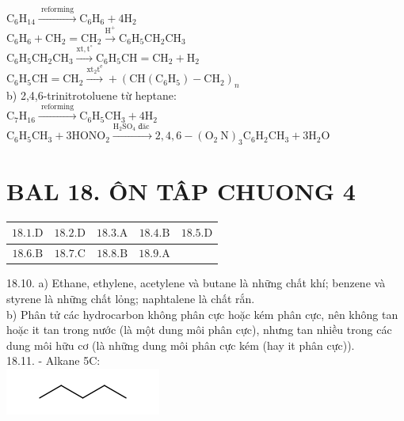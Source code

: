\documentclass[10pt]{article}
\begin{document}
$\mathrm{C}_{6} \mathrm{H}_{14} \xrightarrow{\text { reforming }} \mathrm{C}_{6} \mathrm{H}_{6}+4 \mathrm{H}_{2}$\\
$\mathrm{C}_{6} \mathrm{H}_{6}+\mathrm{CH}_{2}=\mathrm{CH}_{2} \xrightarrow{\mathrm{H}^{+}} \mathrm{C}_{6} \mathrm{H}_{5} \mathrm{CH}_{2} \mathrm{CH}_{3}$\\
$\mathrm{C}_{6} \mathrm{H}_{5} \mathrm{CH}_{2} \mathrm{CH}_{3} \xrightarrow{\mathrm{xt}, \mathrm{t}^{\circ}} \mathrm{C}_{6} \mathrm{H}_{5} \mathrm{CH}=\mathrm{CH}_{2}+\mathrm{H}_{2}$\\
$\mathrm{C}_{6} \mathrm{H}_{5} \mathrm{CH}=\mathrm{CH}_{2} \xrightarrow{\mathrm{xt}_{2} \mathrm{t}^{\mathrm{e}}}+\left(\mathrm{CH}\left(\mathrm{C}_{6} \mathrm{H}_{5}\right)-\mathrm{CH}_{2}\right)_{n}$\\
b) 2,4,6-trinitrotoluene từ heptane:\\
$\mathrm{C}_{7} \mathrm{H}_{16} \xrightarrow{\text { reforming }} \mathrm{C}_{6} \mathrm{H}_{5} \mathrm{CH}_{3}+4 \mathrm{H}_{2}$\\
$\mathrm{C}_{6} \mathrm{H}_{5} \mathrm{CH}_{3}+3 \mathrm{HONO}_{2} \xrightarrow{\mathrm{H}_{2} \mathrm{SO}_{4} \text { đăc }} 2,4,6-\left(\mathrm{O}_{2} \mathrm{~N}\right)_{3} \mathrm{C}_{6} \mathrm{H}_{2} \mathrm{CH}_{3}+3 \mathrm{H}_{2} \mathrm{O}$

\section*{BAL 18. ÔN TÂP CHUONG 4}
\begin{center}
\begin{tabular}{|c|c|c|c|c|}
\hline
$18.1 . \mathrm{D}$ & $18.2 . \mathrm{D}$ & $18.3 . \mathrm{A}$ & $18.4 . \mathrm{B}$ & $18.5 . \mathrm{D}$ \\
\hline
$18.6 . \mathrm{B}$ & $18.7 . \mathrm{C}$ & $18.8 . \mathrm{B}$ & $18.9 . \mathrm{A}$ &  \\
\hline
\end{tabular}
\end{center}

18.10. a) Ethane, ethylene, acetylene và butane là những chất khí; benzene và styrene là những chất lỏng; naphtalene là chất rắn.\\
b) Phân tử các hydrocarbon không phân cực hoặc kém phân cực, nên không tan hoặc it tan trong nước (là một dung môi phân cực), nhưng tan nhiều trong các dung môi hữu cơ (là những dung môi phân cực kém (hay it phân cực)).\\
18.11. - Alkane 5C:\\
\includegraphics{smile-2ccee4c44810ebbef84f1a2e90135be482aca89b}
\end{document}
